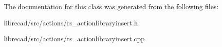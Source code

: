 The documentation for this class was generated from the following files\-:\begin{DoxyCompactItemize}
\item 
librecad/src/actions/rs\-\_\-actionlibraryinsert.\-h\item 
librecad/src/actions/rs\-\_\-actionlibraryinsert.\-cpp\end{DoxyCompactItemize}
